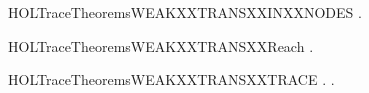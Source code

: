 \newcommand{\HOLTraceTheoremsWEAKXXTRANSXXANDXXTRACE}{\UseVerbatim{HOLTraceTheoremsWEAKXXTRANSXXANDXXTRACE}}
\begin{SaveVerbatim}{HOLTraceTheoremsWEAKXXTRANSXXINXXNODES}
\HOLTokenTurnstile{} \HOLSymConst{\HOLTokenForall{}}  .  \HOLTokenWeakTransBegin{}\HOLTokenWeakTransEnd {} \HOLSymConst{\HOLTokenImp{}}  \HOLConst{\HOLTokenIn{}}  
\end{SaveVerbatim}
\newcommand{\HOLTraceTheoremsWEAKXXTRANSXXINXXNODES}{\UseVerbatim{HOLTraceTheoremsWEAKXXTRANSXXINXXNODES}}
\begin{SaveVerbatim}{HOLTraceTheoremsWEAKXXTRANSXXReach}
\HOLTokenTurnstile{} \HOLSymConst{\HOLTokenForall{}}  .  \HOLTokenWeakTransBegin{}\HOLTokenWeakTransEnd {} \HOLSymConst{\HOLTokenImp{}}   
\end{SaveVerbatim}
\newcommand{\HOLTraceTheoremsWEAKXXTRANSXXReach}{\UseVerbatim{HOLTraceTheoremsWEAKXXTRANSXXReach}}
\begin{SaveVerbatim}{HOLTraceTheoremsWEAKXXTRANSXXTRACE}
\HOLTokenTurnstile{} \HOLSymConst{\HOLTokenForall{}}  .  \HOLTokenWeakTransBegin{}\HOLTokenWeakTransEnd {} \HOLSymConst{\HOLTokenImp{}} \HOLSymConst{\HOLTokenExists{}}.    
\end{SaveVerbatim}
\newcommand{\HOLTraceTheoremsWEAKXXTRANSXXTRACE}{\UseVerbatim{HOLTraceTheoremsWEAKXXTRANSXXTRACE}}

